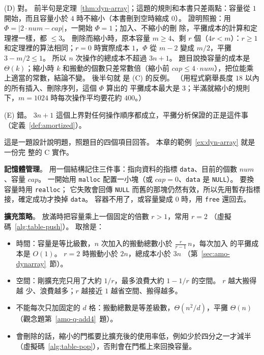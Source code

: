 (D) 對。 前半句是定理~\ref{thm:dyn-array}；這題的規則和本書只差兩點：容量從 $1$
開始，而且容量小於 $4$ 時不縮小（本書刪到空時縮成 $0$）。 證明照搬：用
$\Phi = |2 \cdot \mathit{num} - \mathit{cap}|$，一開始 $\Phi = 1$；加入、不縮小的刪
除，平攤成本的計算和定理裡一樣，都 $\le 3$。 刪除而縮小時，原本容量 $m \ge 4$、剩
$r$ 個（$4r < m$）：$r \ge 1$ 和定理裡的算法相同；$r = 0$ 時實際成本 $1$，$\Phi$ 從
$m - 2$ 變成 $m/2$，平攤 $3 - m/2 \le 1$。 所以 $n$ 次操作的總成本不超過 $3n + 1$。
題目說換容量的成本是 $\Theta(k)$；縮小時 $k$ 和搬動的個數只差常數倍（縮小前
$\mathit{cap} \le 4 \cdot \mathit{num}$），把位能乘上適當的常數，結論不變。 後半句就
是 (C) 的反例。 （用程式窮舉長度 $18$ 以內的所有插入、刪除序列，這個 $\Phi$ 算出的
平攤成本最大是 $3$；半滿就縮小的規則下，$m = 1024$ 時每次操作平均要花約 $400$。）

(E) 錯。 $3n + 1$ 這個上界對任何操作順序都成立，平攤分析保證的正是這件事
（定義~\ref{def:amortized}）。

這是一題設計說明題，照題目的四個項目回答。 本章的範例~\ref{ex:dyn-array} 就是一份完
整的 C 實作。

\textbf{記憶體管理}。 用一個結構記住三件事：指向資料的指標 \texttt{data}、目前的個數
$\mathit{num}$、容量 $\mathit{cap}$。 一開始用 \texttt{malloc} 配置一小塊（或
$\mathit{cap} = 0$、\texttt{data} 是 \texttt{NULL}）。 要換容量時用 \texttt{realloc}；
它失敗會回傳 \texttt{NULL} 而舊的那塊仍然有效，所以先用暫存指標接，確定成功才換掉
\texttt{data}。 容器不用了，或容量變成 $0$ 時，用 \texttt{free} 還回去。

\textbf{擴充策略}。 放滿時把容量乘上一個固定的倍數 $r > 1$，常用 $r = 2$
（虛擬碼~\ref{alg:table-push}）。 取捨是：
\begin{itemize}
\item 時間：容量是等比級數，$n$ 次加入的搬動總數小於 $\frac{r}{r - 1}\, n$，每次加入
的平攤成本是 $O(1)$。 $r = 2$ 時搬動小於 $2n$，總成本小於 $3n$
（第~\ref{sec:amo-dynarray}~節）。
\item 空間：剛擴充完只用了大約 $1/r$，最多浪費大約 $1 - 1/r$ 的空間。 $r$ 越大搬得越
少、浪費越多；$r$ 越接近 $1$ 越省空間、搬得越多。
\item 不能每次只加固定的 $d$ 格：搬動總數是等差級數，$\Theta(n^2/d)$，平攤
$\Theta(n)$（觀念題第~\ref{amo-q-add4}~題）。
\item 會刪除的話，縮小的門檻要比擴充後的使用率低，例如少於四分之一才減半
（虛擬碼~\ref{alg:table-pop}），否則會在門檻上來回換容量。
\end{itemize}

